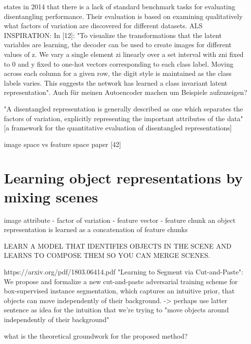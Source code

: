 \documentclass[10pt,letterpaper]{article}
\begin{document}
\par\cite{1412.6583} states in 2014 that there is a lack of standard benchmark tasks for evaluating disentangling performance. Their evaluation is based on examining qualitatively what factors of variation are discovered for different datasets. ALS INSPIRATION: In [12]: "To visualize the transformations that the latent variables are learning, the decoder can be used to create images for different values of z. We vary a single element zi linearly over a set interval with zni fixed to 0 and y fixed to one-hot vectors corresponding to each class label. Moving across each column for a given row, the digit style is maintained as the class labels varies. This suggests the network has learned a class invariant latent representation". Auch für meinen Autoencoder machen um Beispiele aufzuzeigen?

\par "A disentangled representation is generally described as one which separates the factors of variation, explicitly representing the important attributes of the data" [a framework for the quantitative evaluation of disentangled representations]

\par image space vs feature space paper [42]

\section{Learning object representations by mixing scenes}
image attribute - factor of variation - feature vector - feature chunk
an object representation is learned as a concatenation of feature chunks

\par LEARN A MODEL THAT IDENTIFIES OBJECTS IN THE SCENE AND LEARNS TO COMPOSE THEM SO YOU CAN MERGE SCENES.

\par https://arxiv.org/pdf/1803.06414.pdf "Learning to Segment via Cut-and-Paste": We propose and formalize a new cut-and-paste adversarial training scheme for box-supervised instance segmentation, which captures an intuitive prior, that objects can move independently of their background.
-> perhaps use latter sentence as idea for the intuition that we're trying to "move objects around independently of their background"

\par what is the theoretical groundwork for the proposed method?
\end{document}
